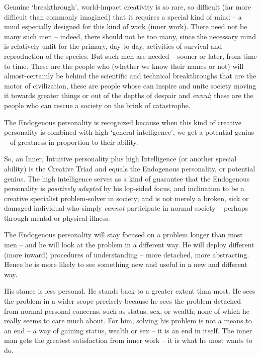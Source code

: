 \documentclass[
]{book}
\begin{document}
Genuine `breakthrough', world-impact creativity is so rare, so difficult (far more difficult than commonly imagined) that it requires a special kind of mind -- a mind especially designed for this kind of work (inner work). There need not be many such men -- indeed, there should not be too many, since the necessary mind is relatively unfit for the primary, day-to-day, activities of survival and reproduction of the species. But such men are needed -- sooner or later, from time to time.
These are the people who (whether we know their names or not) will almost-certainly be behind the scientific and technical breakthroughs that are the motor of civilization, these are people whose can inspire and unite society moving it towards greater things or out of the depths of despair and \emph{ennui}; these are the people who can rescue a society on the brink of catastrophe.

The Endogenous personality is recognized because when this kind of creative personality is combined with high `general intelligence', we get a potential genius -- of greatness in proportion to their ability.

So, an Inner, Intuitive personality plus high Intelligence (or another special ability) is the Creative Triad and equals the Endogenous personality, or potential genius. The high intelligence serves as a kind of guarantee that the Endogenous personality is \emph{positively adapted} by his lop-sided focus, and inclination to be a creative specialist problem-solver in society; and is not merely a broken, sick or damaged individual who simply \emph{cannot} participate in normal society -- perhaps through mental or physical illness.

The Endogenous personality will stay focused on a problem longer than most men -- and he will look at the problem in a different way. He will deploy different (more inward) procedures of understanding -- more detached, more abstracting. Hence he is more likely to see something new and useful in a new and different way.

His stance is less personal. He stands back to a greater extent than most. He sees the problem in a wider scope precisely because he sees the problem detached from normal personal concerns, such as status, sex, or wealth; none of which he really seems to care much about. For him, solving his problem is not a means to an end -- a way of gaining status, wealth or sex -- it is an end in itself. The inner man gets the greatest satisfaction from inner work -- it is what he most wants to do.
\end{document}
